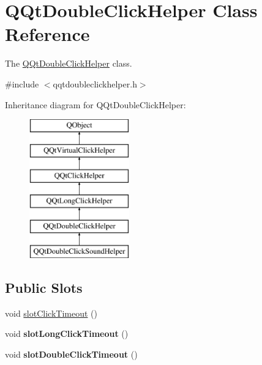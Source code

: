\hypertarget{class_q_qt_double_click_helper}{}\section{Q\+Qt\+Double\+Click\+Helper Class Reference}
\label{class_q_qt_double_click_helper}


The \mbox{\hyperlink{class_q_qt_double_click_helper}{Q\+Qt\+Double\+Click\+Helper}} class.  




{\ttfamily \#include $<$qqtdoubleclickhelper.\+h$>$}

Inheritance diagram for Q\+Qt\+Double\+Click\+Helper\+:\begin{figure}[H]
\begin{center}
\leavevmode
\includegraphics[height=6.000000cm]{class_q_qt_double_click_helper}
\end{center}
\end{figure}
\subsection*{Public Slots}
\begin{DoxyCompactItemize}
\item 
void \mbox{\hyperlink{class_q_qt_double_click_helper_ab6526188b90a5466131f40aaad633cd0}{slot\+Click\+Timeout}} ()
\item 
\mbox{\label{class_q_qt_double_click_helper_a1b80a8c9ac0b45841789a5656d6431b8}} 
void {\bfseries slot\+Long\+Click\+Timeout} ()
\item 
\mbox{\label{class_q_qt_double_click_helper_a29307886d3f770d852d20bf936b58485}} 
void {\bfseries slot\+Double\+Click\+Timeout} ()
\end{DoxyCompactItemize}
